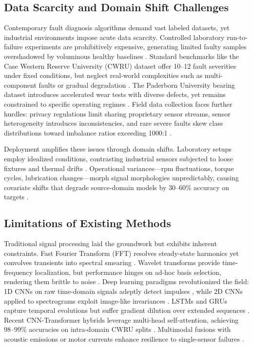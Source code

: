 \subsection{Data Scarcity and Domain Shift Challenges}

Contemporary fault diagnosis algorithms demand vast labeled datasets, yet industrial environments impose acute data scarcity. Controlled laboratory run-to-failure experiments are prohibitively expensive, generating limited faulty samples overshadowed by voluminous healthy baselines \cite{cite5}. Standard benchmarks like the Case Western Reserve University (CWRU) dataset \cite{casewestern2010} offer 10--12 fault severities under fixed conditions, but neglect real-world complexities such as multi-component faults or gradual degradation \cite{cite6}. The Paderborn University bearing dataset \cite{paderborn2014} introduces accelerated wear tests with diverse defects, yet remains constrained to specific operating regimes \cite{cite7}. Field data collection faces further hurdles: privacy regulations limit sharing proprietary sensor streams, sensor heterogeneity introduces inconsistencies, and rare severe faults skew class distributions toward imbalance ratios exceeding 1000:1 \cite{cite8}.

Deployment amplifies these issues through domain shifts. Laboratory setups employ idealized conditions, contrasting industrial sensors subjected to loose fixtures and thermal drifts \cite{cite25}. Operational variances—rpm fluctuations, torque cycles, lubrication changes—morph signal morphologies unpredictably, causing covariate shifts that degrade source-domain models by 30--60\% accuracy on targets \cite{cite9}\cite{cite26}.

\subsection{Limitations of Existing Methods}

Traditional signal processing laid the groundwork but exhibits inherent constraints. Fast Fourier Transform (FFT) resolves steady-state harmonics yet convolves transients into spectral smearing \cite{cite10}. Wavelet transforms provide time-frequency localization, but performance hinges on ad-hoc basis selection, rendering them brittle to noise \cite{cite11}\cite{dragomiretskiy2014emd}. Deep learning paradigms revolutionized the field: 1D CNNs on raw time-domain signals adeptly detect impulses \cite{cite12}\cite{wen2019convolutional}, while 2D CNNs applied to spectrograms exploit image-like invariances \cite{cite13}\cite{jia2016deep,verstraete2020cnn}. LSTMs and GRUs capture temporal evolutions but suffer gradient dilution over extended sequences \cite{cite14}. Recent CNN-Transformer hybrids leverage multi-head self-attention, achieving 98--99\% accuracies on intra-domain CWRU splits \cite{cite15}\cite{hoang2023vit}. Multimodal fusions with acoustic emissions or motor currents enhance resilience to single-sensor failures \cite{cite16}.

